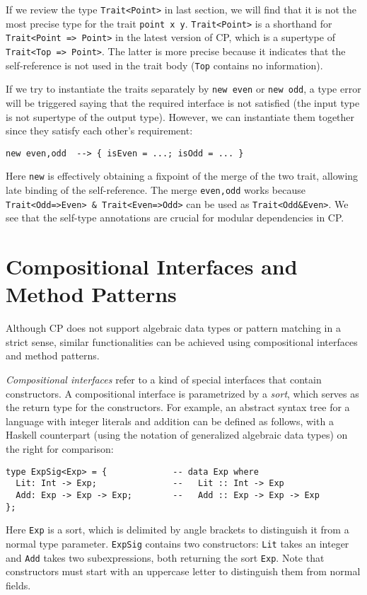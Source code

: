 \begin{tipblock}
If we review the type \lstinline{Trait<Point>} in last section, we will find
that it is not the most precise type for the trait \lstinline{point x y}.
\lstinline{Trait<Point>} is a shorthand for \lstinline{Trait<Point => Point>} in
the latest version of CP, which is a supertype of \lstinline{Trait<Top => Point>}.
The latter is more precise because it indicates that the self-reference is not
used in the trait body (\lstinline{Top} contains no information).
\end{tipblock}

\noindent
If we try to instantiate the traits separately by \lstinline{new even} or
\lstinline{new odd}, a type error will be triggered saying that the required
interface is not satisfied (the input type is not supertype of the output type).
However, we can instantiate them together since they satisfy each other's
requirement:
\begin{lstlisting}
new even,odd  --> { isEven = ...; isOdd = ... }
\end{lstlisting}
Here \lstinline{new} is effectively obtaining a fixpoint of the merge of the two
trait, allowing late binding of the self-reference. The merge
\lstinline{even,odd} works because \lstinline{Trait<Odd=>Even> & Trait<Even=>Odd>}
can be used as \lstinline{Trait<Odd&Even>}. We see that the self-type annotations
are crucial for modular dependencies in CP.

\section{Compositional Interfaces and Method Patterns}

Although CP does not support algebraic data types or pattern matching in a
strict sense, similar functionalities can be achieved using compositional
interfaces and method patterns.

\emph{Compositional interfaces} refer to a kind of special interfaces that
contain constructors. A compositional interface is parametrized by a
\emph{sort}, which serves as the return type for the constructors. For example,
an abstract syntax tree for a language with integer literals and addition can be
defined as follows, with a Haskell counterpart (using the notation of
generalized algebraic data types) on the right for comparison:
\begin{lstlisting}
type ExpSig<Exp> = {             -- data Exp where
  Lit: Int -> Exp;               --   Lit :: Int -> Exp
  Add: Exp -> Exp -> Exp;        --   Add :: Exp -> Exp -> Exp
};
\end{lstlisting}
Here \lstinline{Exp} is a sort, which is delimited by angle brackets to
distinguish it from a normal type parameter. \lstinline{ExpSig} contains two
constructors: \lstinline{Lit} takes an integer and \lstinline{Add} takes two
subexpressions, both returning the sort \lstinline{Exp}. Note that constructors
must start with an uppercase letter to distinguish them from normal fields.

